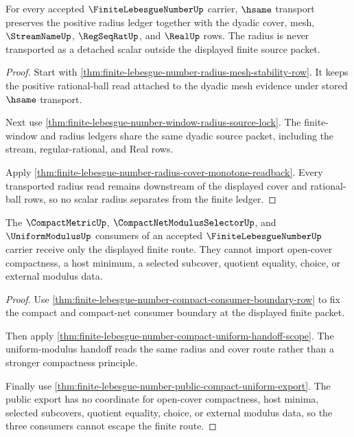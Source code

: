 \begin{theorem}
\label{thm:finite-lebesgue-number-ledger-transport}
For every accepted $\FiniteLebesgueNumberUp$ carrier, $\hsame$ transport preserves the positive radius ledger together with the dyadic cover, mesh, $\StreamNameUp$, $\RegSeqRatUp$, and $\RealUp$ rows. The radius is never transported as a detached scalar outside the displayed finite source packet.
\end{theorem}
\begin{proof}
Start with \autoref{thm:finite-lebesgue-number-radius-mesh-stability-row}. It keeps the positive rational-ball read attached to the dyadic mesh evidence under stored $\hsame$ transport.

Next use \autoref{thm:finite-lebesgue-number-window-radius-source-lock}. The finite-window and radius ledgers share the same dyadic source packet, including the stream, regular-rational, and Real rows.

Apply \autoref{thm:finite-lebesgue-number-radius-cover-monotone-readback}. Every transported radius read remains downstream of the displayed cover and rational-ball rows, so no scalar radius separates from the finite ledger.
\end{proof}

\begin{theorem}
\label{thm:finite-lebesgue-number-consumer-nonescape-triad}
The $\CompactMetricUp$, $\CompactNetModulusSelectorUp$, and $\UniformModulusUp$ consumers of an accepted $\FiniteLebesgueNumberUp$ carrier receive only the displayed finite route. They cannot import open-cover compactness, a host minimum, a selected subcover, quotient equality, choice, or external modulus data.
\end{theorem}
\begin{proof}
Use \autoref{thm:finite-lebesgue-number-compact-consumer-boundary-row} to fix the compact and compact-net consumer boundary at the displayed finite packet.

Then apply \autoref{thm:finite-lebesgue-number-compact-uniform-handoff-scope}. The uniform-modulus handoff reads the same radius and cover route rather than a stronger compactness principle.

Finally use \autoref{thm:finite-lebesgue-number-public-compact-uniform-export}. The public export has no coordinate for open-cover compactness, host minima, selected subcovers, quotient equality, choice, or external modulus data, so the three consumers cannot escape the finite route.
\end{proof}
